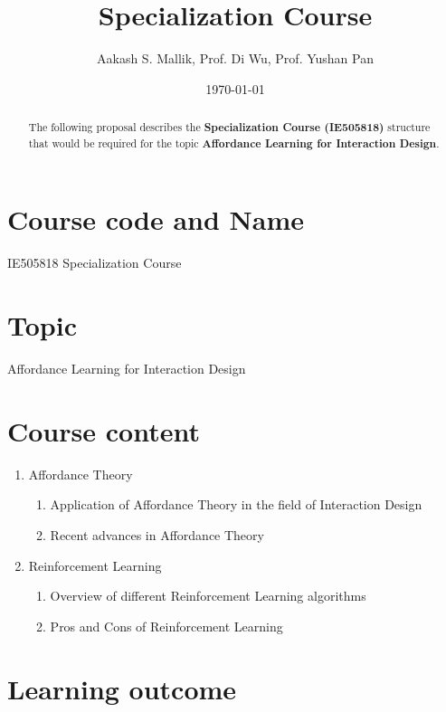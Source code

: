 \documentclass[letterpaper,12pt]{article}
\begin{document}
\title{Specialization Course}
\author{Aakash S. Mallik, Prof. Di Wu, Prof. Yushan Pan}
\date{\today}
\maketitle

\begin{abstract}
The following proposal describes the 
\textbf{Specialization Course (IE505818)} structure that would be required for the topic \textbf{Affordance Learning for Interaction Design}.
\end{abstract}


\section{Course code and Name}

IE505818 Specialization Course

\section{Topic}

Affordance Learning for Interaction Design

\section{Course content}

\begin{enumerate}
	\item Affordance Theory
	\begin{enumerate}
		\item Application of Affordance Theory in the field of Interaction Design
		\item Recent advances in Affordance Theory
	\end{enumerate}
	\item Reinforcement Learning
	\begin{enumerate}
		\item Overview of different Reinforcement Learning algorithms
		\item Pros and Cons of Reinforcement Learning
	\end{enumerate}
\end{enumerate}

\section{Learning outcome}
\end{document}

